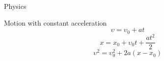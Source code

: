 \newpage
\begin{section}{Physics}
	\begin{subsection}{Motion with constant acceleration}
		$$\upsilon = \upsilon_0 + at $$
		$$x = x_0 + \upsilon_0t + \frac{at^2}{2} $$
		$$ \upsilon^2 = \upsilon_0^2 + 2a(x-x_0) $$

	\end{subsection}
\end{section}
